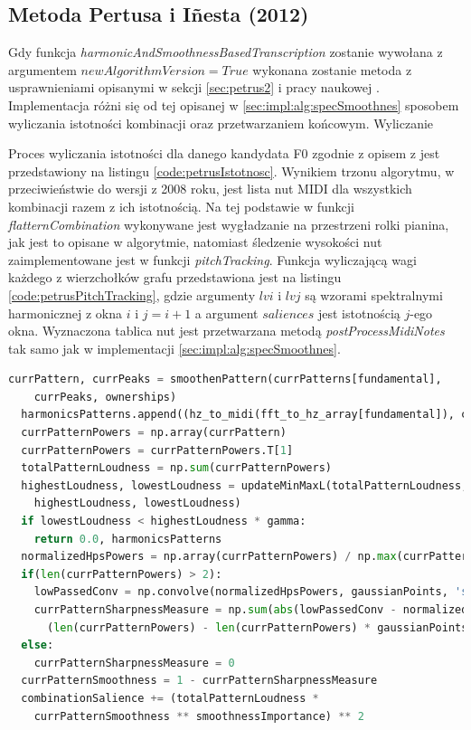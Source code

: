 \documentclass[12pt,a4paper,twoside]{mwart}
\begin{document}
\subsection{Metoda Pertusa i Iñesta (2012)}\label{sec:impl:alg:specSmoothnes:improved}
Gdy funkcja \textit{harmonicAndSmoothnessBasedTranscription} zostanie wywołana z argumentem $newAlgorithmVersion = True$ wykonana zostanie metoda z usprawnieniami opisanymi w sekcji \ref{sec:petrus2} i pracy naukowej \cite{Transcription:Pertus:Inharmonicity2}. Implementacja różni się od tej opisanej w \ref{sec:impl:alg:specSmoothnes} sposobem wyliczania istotności kombinacji oraz przetwarzaniem końcowym. Wyliczanie 

Proces wyliczania istotności dla danego kandydata F0 zgodnie z opisem z \cite{Transcription:Pertus:Inharmonicity2} jest przedstawiony na listingu \ref{code:petrusIstotnosc}. Wynikiem trzonu algorytmu, w przeciwieństwie do wersji z 2008 roku, jest lista nut MIDI dla wszystkich kombinacji razem z ich istotnością. Na tej podstawie w funkcji \textit{flatternCombination} wykonywane jest wygładzanie na przestrzeni rolki pianina, jak jest to opisane w algorytmie, natomiast śledzenie wysokości nut zaimplementowane jest w funkcji \textit{pitchTracking}. Funkcja wyliczającą wagi każdego z wierzchołków grafu przedstawiona jest na listingu \ref{code:petrusPitchTracking}, gdzie argumenty $lvi$ i $lvj$ są wzorami spektralnymi harmonicznej z okna $i$ i $j = i + 1$ a argument $saliences$ jest istotnością $j$-ego okna. Wyznaczona tablica nut jest przetwarzana metodą \textit{postProcessMidiNotes} tak samo jak w implementacji \ref{sec:impl:alg:specSmoothnes}.

\begin{lstlisting}[language=Python, caption={Wyliczanie istotności w algorytmie Pertusa i Iñesta (2012)}, captionpos=b, label={code:petrusIstotnosc}, numbers=none]
  currPattern, currPeaks = smoothenPattern(currPatterns[fundamental],
    currPeaks, ownerships)
  harmonicsPatterns.append((hz_to_midi(fft_to_hz_array[fundamental]), currPattern))
  currPatternPowers = np.array(currPattern)
  currPatternPowers = currPatternPowers.T[1]
  totalPatternLoudness = np.sum(currPatternPowers)
  highestLoudness, lowestLoudness = updateMinMaxL(totalPatternLoudness,
    highestLoudness, lowestLoudness)
  if lowestLoudness < highestLoudness * gamma:
    return 0.0, harmonicsPatterns
  normalizedHpsPowers = np.array(currPatternPowers) / np.max(currPatternPowers)
  if(len(currPatternPowers) > 2):
    lowPassedConv = np.convolve(normalizedHpsPowers, gaussianPoints, 'same')
    currPatternSharpnessMeasure = np.sum(abs(lowPassedConv - normalizedHpsPowers)) /
      (len(currPatternPowers) - len(currPatternPowers) * gaussianPoints[1])
  else:
    currPatternSharpnessMeasure = 0
  currPatternSmoothness = 1 - currPatternSharpnessMeasure
  combinationSalience += (totalPatternLoudness *
    currPatternSmoothness ** smoothnessImportance) ** 2
\end{lstlisting}
\end{document}
